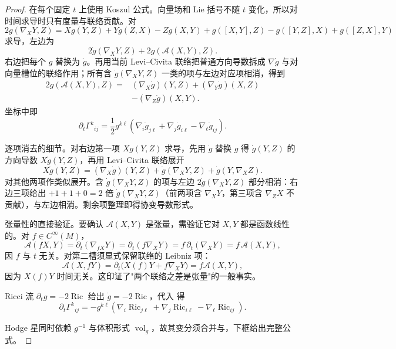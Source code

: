 \begin{proof}
在每个固定 $t$ 上使用 Koszul 公式。向量场和 Lie 括号不随 $t$ 变化，所以对时间求导时只有度量与联络贡献。对
\[
2g(\nabla_XY,Z)
=Xg(Y,Z)+Yg(Z,X)-Zg(X,Y)
+g([X,Y],Z)-g([Y,Z],X)+g([Z,X],Y)
\]
求导，左边为
\[
2\dot g(\nabla_XY,Z)+2g(\mathcal A(X,Y),Z).
\]
右边把每个 $g$ 替换为 $\dot g$。再用当前 Levi--Civita 联络把普通方向导数拆成 $\nabla \dot g$ 与对向量槽位的联络作用；所有含 $\dot g(\nabla_XY,Z)$ 一类的项与左边对应项相消，得到
\begin{equation}\label{eq:math-dg-connection-variation}
\boxed{
\begin{aligned}
2g(\mathcal A(X,Y),Z)
={}&(\nabla_X\dot g)(Y,Z)
+(\nabla_Y\dot g)(X,Z)\\
&-(\nabla_Z\dot g)(X,Y).
\end{aligned}}
\end{equation}
坐标中即
\begin{equation}\label{eq:math-dg-christoffel-variation}
\boxed{
\partial_t\Gamma^k{}_{ij}
=\frac12g^{k\ell}
\left(
\nabla_i \dot g_{j\ell}
+\nabla_j \dot g_{i\ell}
-\nabla_\ell \dot g_{ij}
\right).}
\end{equation}

逐项消去的细节。对右边第一项 $Xg(Y,Z)$ 求导，先用 $\dot g$ 替换 $g$ 得 $\dot g(Y,Z)$ 的方向导数 $X\dot g(Y,Z)$，再用 Levi--Civita 联络展开
\begin{equation*}
X\dot g(Y,Z)
=(\nabla_X\dot g)(Y,Z)
+\dot g(\nabla_XY,Z)+\dot g(Y,\nabla_XZ).
\end{equation*}
对其他两项作类似展开。含 $\dot g(\nabla_XY,Z)$ 的项与左边 $2\dot g(\nabla_XY,Z)$ 部分相消：右边三项给出 $+1+1+0=2$ 倍 $\dot g(\nabla_XY,Z)$（前两项含 $\nabla_XY$，第三项含 $\nabla_ZX$ 不贡献），与左边相消。剩余项整理即得协变导数形式。

张量性的直接验证。要确认 $\mathcal A(X,Y)$ 是张量，需验证它对 $X,Y$ 都是函数线性的。对 $f\in C^\infty(M)$，
\begin{equation*}
\mathcal A(fX,Y)=\partial_t(\nabla_{fX}Y)=\partial_t(f\nabla_XY)=f\,\partial_t(\nabla_XY)=f\,\mathcal A(X,Y),
\end{equation*}
因 $f$ 与 $t$ 无关。对第二槽须显式保留联络的 Leibniz 项：
\[
\mathcal A(X,fY)=\partial_t\bigl(X(f)Y+f\nabla_XY\bigr)
=f\mathcal A(X,Y),
\]
因为 $X(f)Y$ 时间无关。这印证了"两个联络之差是张量"的一般事实。

Ricci 流 $\partial_tg=-2\operatorname{Ric}$ 给出 $\dot g=-2\operatorname{Ric}$，代入 得
\begin{equation*}
\partial_t\Gamma^k{}_{ij}
=-g^{k\ell}\left(
\nabla_i\operatorname{Ric}_{j\ell}
+\nabla_j\operatorname{Ric}_{i\ell}
-\nabla_\ell\operatorname{Ric}_{ij}
\right).
\end{equation*}

Hodge 星同时依赖 $g^{-1}$ 与体积形式 $\operatorname{vol}_g$，故其变分须合并与，下框给出完整公式。
\end{proof}

